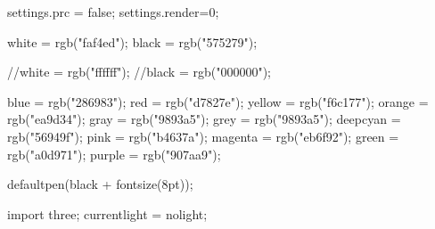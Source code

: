\renewcommand{\lstlistingname}{{\sc Code}}
\renewcommand{\lstlistlistingname}{List of \lstlistingname s}
\newcommand\ubar[1]{\underaccent{\bar}{#1}}

\begin{asydef}
	settings.prc = false;
	settings.render=0;

	white = rgb("faf4ed");
	black = rgb("575279");

	//white = rgb("ffffff");
	//black = rgb("000000");

	blue = rgb("286983");
	red = rgb("d7827e");
	yellow = rgb("f6c177");
	orange = rgb("ea9d34");
	gray = rgb("9893a5");
	grey = rgb("9893a5");
	deepcyan = rgb("56949f");
	pink = rgb("b4637a");
	magenta = rgb("eb6f92");
	green = rgb("a0d971");
	purple = rgb("907aa9");

	defaultpen(black + fontsize(8pt));

	import three;
	currentlight = nolight;
\end{asydef}

\makeatletter
\g@addto@macro\bfseries{\boldmath}
\makeatother
\let\ds\displaystyle
\let\ts\textstyle
\def\bfm#1{\mathbf{#1}}

\newcommand\ZdZ{\ensuremath{\sfrac\Z{2\Z}}}

\def\algorithmicrequire{\textbf{Entrée}}
\def\algorithmicensure{\textbf{Sortie}}
\def\algorithmicend{\textbf{fin}}
\def\algorithmicif{\textbf{si}}
\def\algorithmicthen{\textbf{alors}}
\def\algorithmicelse{\textbf{sinon}}
\def\algorithmicelsif{\algorithmicelse\ \algorithmicif}
\def\algorithmicendif{\algorithmicend\ \algorithmicif}
\def\algorithmicfor{\textbf{pour}}
\def\algorithmicprocedure{\textbf{Procédure}}
\def\algorithmicfunction{\textbf{Fonction}}
\def\algorithmicforall{\textbf{pour tout}}
\def\algorithmicdo{\textbf{faire}}
\def\algorithmicendfor{\algorithmicend\ \algorithmicfor}
\def\algorithmicwhile{\textbf{tant que}}
\def\algorithmicendwhile{\algorithmicend\ \algorithmicwhile}
\def\algorithmicloop{\textbf{répéter indéfiniment}}
\def\algorithmicendloop{\algorithmicend\ \algorithmicloop}
\def\algorithmicrepeat{\textbf{répéter}}
\def\algorithmicuntil{\textbf{jusqu'à que}}
\def\algorithmicprint{\textbf{afficher}}
\def\algorithmicreturn{\textbf{retourner}}
\def\algorithmictrue{\textsc{vrai}}
\def\algorithmicfalse{\textsc{faux}}

\let\Sortie\Ensure
\let\Entree\Require
{}

\let\addmacros\relax


